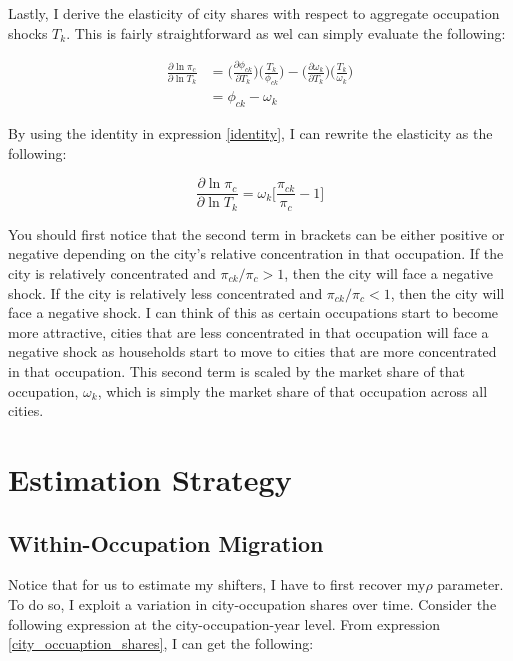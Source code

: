 \documentclass[10pt]{article}
\begin{document}
Lastly, I derive the elasticity of city shares with respect to aggregate occupation shocks $T_k$. This is fairly straightforward as wel can simply evaluate the following:

\begin{align*}
    \frac{\partial\ln{\pi_{c}}}{\partial\ln{T_{k}}} & = \Big(\frac{\partial{\phi_{ck}}}{\partial{T_{k}}}\Big)\Big(\frac{T_{k}}{\phi_{ck}}\Big) - \Big(\frac{\partial{\omega_{k}}}{\partial{T_{k}}}\Big)\Big(\frac{T_{k}}{\omega_{k}}\Big) \\ &= \phi_{ck}-\omega_{k}
\end{align*}

By using the identity in expression \ref{identity}, I can rewrite the elasticity as the following:

\begin{equation}
    \frac{\partial\ln{\pi_{c}}}{\partial\ln{T_{k}}} = {\omega_{k}}\Bigg[\frac{\pi_{ck}}{\pi_{c}}-1\Bigg]
    \label{city_occupation_elasticity}
\end{equation}

You should first notice that the second term in brackets can be either positive or negative depending on the city's relative concentration in that occupation. If the city is relatively concentrated and $\pi_{ck} / \pi_c > 1$, then the city will face a negative shock. If the city is relatively less concentrated and $\pi_{ck} / \pi_c < 1$, then the city will face a negative shock. I can think of this as certain occupations start to become more attractive, cities that are less concentrated in that occupation will face a negative shock as households start to move to cities that are more concentrated in that occupation. This second term is scaled by the market share of that occupation, $\omega_k$, which is simply the market share of that occupation across all cities.

\section{Estimation Strategy}

\subsection{Within-Occupation Migration}

Notice that for us to estimate my shifters, I have to first recover my$\rho$ parameter. To do so, I exploit a variation in city-occupation shares over time. Consider the following expression at the city-occupation-year level. From expression \ref{city_occuaption_shares}, I can get the following:
\end{document}
